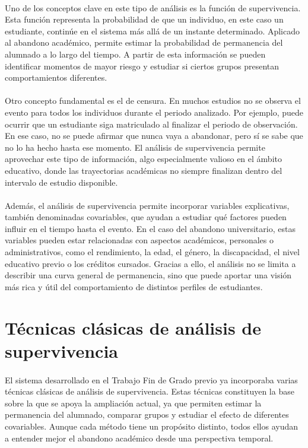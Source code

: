 \paragraph*{}Uno de los conceptos clave en este tipo de análisis es la función de supervivencia. Esta función representa la probabilidad de que un individuo, en este caso un estudiante, continúe en el sistema más allá de un instante determinado. Aplicado al abandono académico, permite estimar la probabilidad de permanencia del alumnado a lo largo del tiempo. A partir de esta información se pueden identificar momentos de mayor riesgo y estudiar si ciertos grupos presentan comportamientos diferentes.

\paragraph*{}Otro concepto fundamental es el de censura. En muchos estudios no se observa el evento para todos los individuos durante el periodo analizado. Por ejemplo, puede ocurrir que un estudiante siga matriculado al finalizar el periodo de observación. En ese caso, no se puede afirmar que nunca vaya a abandonar, pero sí se sabe que no lo ha hecho hasta ese momento. El análisis de supervivencia permite aprovechar este tipo de información, algo especialmente valioso en el ámbito educativo, donde las trayectorias académicas no siempre finalizan dentro del intervalo de estudio disponible.

\paragraph*{}Además, el análisis de supervivencia permite incorporar variables explicativas, también denominadas covariables, que ayudan a estudiar qué factores pueden influir en el tiempo hasta el evento. En el caso del abandono universitario, estas variables pueden estar relacionadas con aspectos académicos, personales o administrativos, como el rendimiento, la edad, el género, la discapacidad, el nivel educativo previo o los créditos cursados. Gracias a ello, el análisis no se limita a describir una curva general de permanencia, sino que puede aportar una visión más rica y útil del comportamiento de distintos perfiles de estudiantes.

\section{Técnicas clásicas de análisis de supervivencia}
\paragraph*{}El sistema desarrollado en el Trabajo Fin de Grado previo ya incorporaba varias técnicas clásicas de análisis de supervivencia. Estas técnicas constituyen la base sobre la que se apoya la ampliación actual, ya que permiten estimar la permanencia del alumnado, comparar grupos y estudiar el efecto de diferentes covariables. Aunque cada método tiene un propósito distinto, todos ellos ayudan a entender mejor el abandono académico desde una perspectiva temporal.

